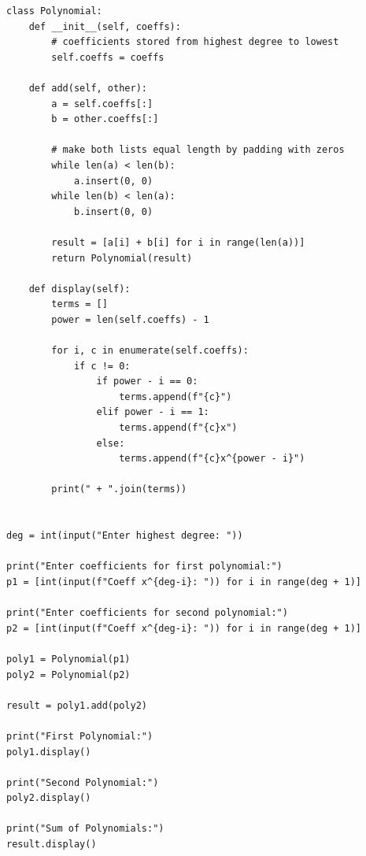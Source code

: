 \begin{verbatim}
class Polynomial:
    def __init__(self, coeffs):
        # coefficients stored from highest degree to lowest
        self.coeffs = coeffs

    def add(self, other):
        a = self.coeffs[:]
        b = other.coeffs[:]

        # make both lists equal length by padding with zeros
        while len(a) < len(b):
            a.insert(0, 0)
        while len(b) < len(a):
            b.insert(0, 0)

        result = [a[i] + b[i] for i in range(len(a))]
        return Polynomial(result)

    def display(self):
        terms = []
        power = len(self.coeffs) - 1

        for i, c in enumerate(self.coeffs):
            if c != 0:
                if power - i == 0:
                    terms.append(f"{c}")
                elif power - i == 1:
                    terms.append(f"{c}x")
                else:
                    terms.append(f"{c}x^{power - i}")

        print(" + ".join(terms))


deg = int(input("Enter highest degree: "))

print("Enter coefficients for first polynomial:")
p1 = [int(input(f"Coeff x^{deg-i}: ")) for i in range(deg + 1)]

print("Enter coefficients for second polynomial:")
p2 = [int(input(f"Coeff x^{deg-i}: ")) for i in range(deg + 1)]

poly1 = Polynomial(p1)
poly2 = Polynomial(p2)

result = poly1.add(poly2)

print("First Polynomial:")
poly1.display()

print("Second Polynomial:")
poly2.display()

print("Sum of Polynomials:")
result.display()
\end{verbatim}